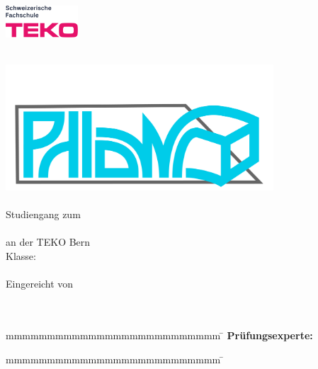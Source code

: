 
\begin{titlepage}
    \includegraphics[width=2.7cm]{../content/images/teko.png}
	
	\enlargethispage{20mm}
	\begin{center}
		\vspace*{12mm}	{\large\normalfont \arbeit}\\
		\includegraphics[width=10cm]{../content/images/phlowr.png}\\
		\vspace*{3mm}	{\large\bfseries \subthema }\\
    \vspace*{12mm}  Studiengang zum \\
		\vspace*{3mm}	  \studiengang\\
    \vspace*{3mm}   an der TEKO Bern\\
    \vspace*{3mm}   Klasse:\\ 
    \vspace*{2mm}   \studienjahrgang\\
		\vspace*{12mm}	Eingereicht von\\
		\vspace*{3mm} 	{\large\normalfont \autor}\\
		\vspace*{12mm}	\datumAbgabe\\
	\end{center}
	\vspace{2cm}
	\begin{figure}[htp]
	\end{figure}
	\vfill
	\begin{spacing}{1.2}
		\begin{tabbing}
			mmmmmmmmmmmmmmmmmmmmmmmmmm      \= \kill
			\textbf{Prüfungsexperte:}                 \>  \gutachter
		\end{tabbing}
    \begin{tabbing}
      mmmmmmmmmmmmmmmmmmmmmmmmmm      \= \kill
    \end{tabbing}
		\end{spacing}
		\vspace*{20mm}
\end{titlepage}
